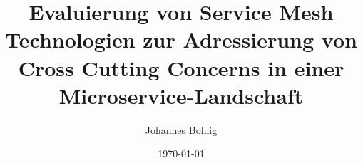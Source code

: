 \documentclass[a4paper,12pt]{scrartcl}
\title{Evaluierung von Service Mesh Technologien zur Adressierung von Cross Cutting Concerns in einer Microservice-Landschaft}
\author{Johannes Bohlig}
\date{\today}
\begin{document}
\iffalse
 
\fi

\tableofcontents

\pagebreak
\end{document}
